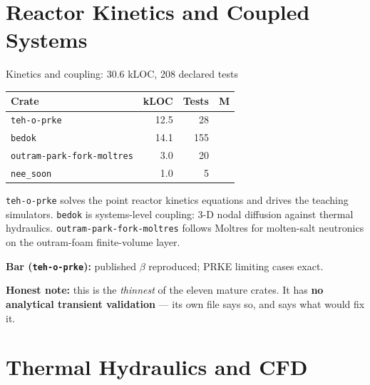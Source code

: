 \documentclass[aspectratio=169]{beamer}
\newcommand{\statustab}[1]{{\footnotesize\setlength{\tabcolsep}{4pt}#1}}
\begin{document}
\section{Reactor Kinetics and Coupled Systems}

\begin{frame}{Kinetics and coupling: 30.6 kLOC, 208 declared tests}
    \statustab{
    \begin{tabular}{lrrc}
        \toprule
        \textbf{Crate} & \textbf{kLOC} & \textbf{Tests} & \textbf{M} \\
        \midrule
        \texttt{teh-o-prke}              & 12.5 &  28 & \checkmark \\
        \texttt{bedok}                   & 14.1 & 155 & \\
        \texttt{outram-park-fork-moltres}&  3.0 &  20 & \\
        \texttt{nee\_soon}               &  1.0 &   5 & \\
        \bottomrule
    \end{tabular}}

    \medskip
    \texttt{teh-o-prke} solves the point reactor kinetics equations and drives
    the teaching simulators. \texttt{bedok} is systems-level coupling: 3-D
    nodal diffusion against thermal hydraulics.
    \texttt{outram-park-fork-moltres} follows Moltres
    \parencite{lindsay2018moltres} for molten-salt neutronics on the
    outram-foam finite-volume layer.

    \medskip
    \textbf{Bar (\texttt{teh-o-prke}):} published $\beta$ reproduced; PRKE
    limiting cases exact.

    \medskip
    \textbf{Honest note:} this is the \emph{thinnest} of the eleven mature
    crates. It has \textbf{no analytical transient validation} --- its own
    file says so, and says what would fix it.
\end{frame}


\section{Thermal Hydraulics and CFD}
\end{document}
